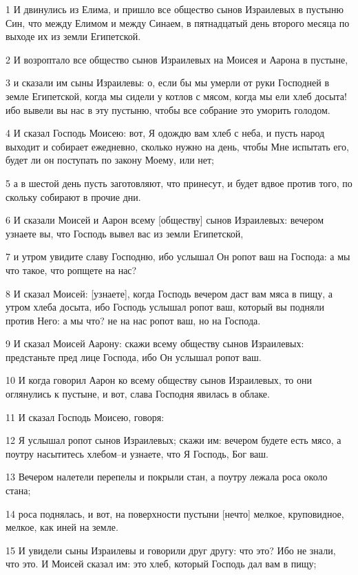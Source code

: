 \par 1 И двинулись из Елима, и пришло все общество сынов Израилевых в пустыню Син, что между Елимом и между Синаем, в пятнадцатый день второго месяца по выходе их из земли Египетской.
\par 2 И возроптало все общество сынов Израилевых на Моисея и Аарона в пустыне,
\par 3 и сказали им сыны Израилевы: о, если бы мы умерли от руки Господней в земле Египетской, когда мы сидели у котлов с мясом, когда мы ели хлеб досыта! ибо вывели вы нас в эту пустыню, чтобы все собрание это уморить голодом.
\par 4 И сказал Господь Моисею: вот, Я одождю вам хлеб с неба, и пусть народ выходит и собирает ежедневно, сколько нужно на день, чтобы Мне испытать его, будет ли он поступать по закону Моему, или нет;
\par 5 а в шестой день пусть заготовляют, что принесут, и будет вдвое против того, по скольку собирают в прочие дни.
\par 6 И сказали Моисей и Аарон всему [обществу] сынов Израилевых: вечером узнаете вы, что Господь вывел вас из земли Египетской,
\par 7 и утром увидите славу Господню, ибо услышал Он ропот ваш на Господа: а мы что такое, что ропщете на нас?
\par 8 И сказал Моисей: [узнаете], когда Господь вечером даст вам мяса в пищу, а утром хлеба досыта, ибо Господь услышал ропот ваш, который вы подняли против Него: а мы что? не на нас ропот ваш, но на Господа.
\par 9 И сказал Моисей Аарону: скажи всему обществу сынов Израилевых: предстаньте пред лице Господа, ибо Он услышал ропот ваш.
\par 10 И когда говорил Аарон ко всему обществу сынов Израилевых, то они оглянулись к пустыне, и вот, слава Господня явилась в облаке.
\par 11 И сказал Господь Моисею, говоря:
\par 12 Я услышал ропот сынов Израилевых; скажи им: вечером будете есть мясо, а поутру насытитесь хлебом--и узнаете, что Я Господь, Бог ваш.
\par 13 Вечером налетели перепелы и покрыли стан, а поутру лежала роса около стана;
\par 14 роса поднялась, и вот, на поверхности пустыни [нечто] мелкое, круповидное, мелкое, как иней на земле.
\par 15 И увидели сыны Израилевы и говорили друг другу: что это? Ибо не знали, что это. И Моисей сказал им: это хлеб, который Господь дал вам в пищу;
